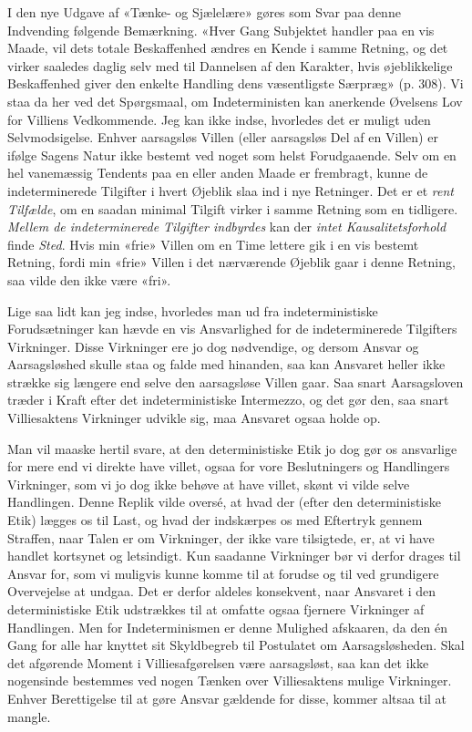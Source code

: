 \documentclass[12pt,a4paper,openany]{book}
\newcommand{\opage}[1]{\marginnote{\footnotesize\textit{[#1]}}}
\begin{document}
I den nye Udgave af «Tænke- og Sjælelære» gøres som Svar paa denne Indvending
følgende Bemærkning. «Hver Gang Subjektet handler paa en vis Maade, vil dets
totale Beskaffenhed ændres en Kende i samme Retning, og det virker saaledes
daglig selv med til Dannelsen af den Karakter, hvis øjeblikkelige Beskaffenhed
giver den enkelte Handling dens væsentligste Særpræg» (p. 308). Vi staa da her
ved det Spørgsmaal, om Indeterministen kan anerkende Øvelsens Lov for Villiens
Vedkommende. Jeg kan ikke indse, hvorledes det er muligt uden Selvmodsigelse.
Enhver aarsagsløs Villen (eller aarsagsløs Del af en Villen) er ifølge Sagens
Natur ikke bestemt ved noget som helst Forudgaaende. Selv om en hel vanemæssig
Tendents paa en eller anden Maade er frembragt, kunne de indeterminerede
Tilgifter i hvert Øjeblik slaa ind i nye Retninger. Det er et \emph{rent
Tilfælde}, om en saadan minimal Tilgift virker i samme Retning som en
tidligere. \emph{Mellem de indeterminerede Tilgifter indbyrdes} kan der
\emph{intet Kausalitetsforhold} finde \emph{Sted}. Hvis min «frie» Villen om en
Time lettere gik i en vis bestemt Retning, fordi min «frie» Villen i det
nærværende Øjeblik gaar i denne Retning, saa vilde den ikke være «fri».

Lige saa lidt kan jeg indse, hvorledes man ud fra indeterministiske
Forudsætninger kan hævde en vis Ansvarlighed for de indeterminerede Tilgifters
Virkninger. Disse Virkninger ere jo dog nødvendige, og dersom Ansvar og
Aarsagsløshed skulle staa og falde med hinanden, saa kan Ansvaret heller ikke
strække sig længere end selve den aarsagsløse Villen gaar. Saa snart
Aarsagsloven træder i Kraft efter det indeterministiske Intermezzo, og det gør
den, saa snart Villiesaktens Virkninger udvikle sig, maa Ansvaret ogsaa holde op.

Man vil maaske hertil svare, at den deterministiske Etik jo dog gør os
ansvarlige for mere end vi direkte have villet, ogsaa for vore Beslutningers og
Handlingers Virkninger, som vi jo dog ikke behøve at have villet, skønt vi
vilde selve Handlingen. Denne Replik vilde oversé, at hvad der (efter den
deterministiske Etik) lægges os til Last, og hvad der indskærpes os med
Eftertryk gennem Straffen, naar Talen er om Virkninger, der ikke vare
tilsigtede, er, at vi have handlet kortsynet og letsindigt. Kun saadanne
Virkninger bør vi derfor drages til Ansvar for, som vi muligvis kunne komme til
at forudse og til ved grundigere Overvejelse at undgaa. Det er derfor aldeles
konsekvent, naar Ansvaret i den
\setcounter{footnote}{0}%
\opage{103}deterministiske Etik udstrækkes til at omfatte ogsaa fjernere
Virkninger af Handlingen. Men for Indeterminismen er denne Mulighed afskaaren,
da den én Gang for alle har knyttet sit Skyldbegreb til Postulatet om
Aarsagsløsheden. Skal det afgørende Moment i Villiesafgørelsen være
aarsagsløst, saa kan det ikke nogensinde bestemmes ved nogen Tænken over
Villiesaktens mulige Virkninger. Enhver Berettigelse til at gøre Ansvar
gældende for disse, kommer altsaa til at mangle.
\end{document}
